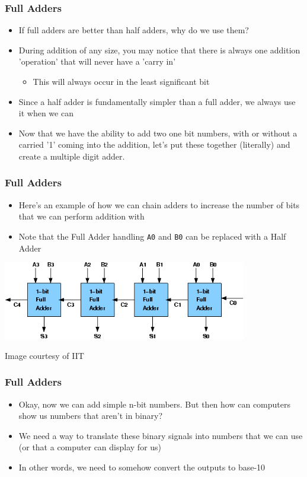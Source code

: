 \documentclass{beamer}
\begin{document}
		\begin{frame}
			\frametitle{Full Adders}
			\begin{itemize}
				\item If full adders are better than half adders, why do we use them?
				\item During addition of any size, you may notice that there is always one addition 'operation' that will never have a 'carry in'
				\begin{itemize}
					\item This will always occur in the least significant bit
				\end{itemize}
				\item Since a half adder is fundamentally simpler than a full adder, we always use it when we can
				\item Now that we have the ability to add two one bit numbers, with or without a carried '1' coming into the addition, let's put these together (literally) and create a multiple digit adder.
			\end{itemize}
		\end{frame}
		
		
		\begin{frame}
			\frametitle{Full Adders}
			\begin{itemize}
				\item Here's an example of how we can chain adders to increase the number of bits that we can perform addition with
				\item Note that the Full Adder handling \texttt{A0} and \texttt{B0} can be replaced with a Half Adder\linebreak
			\end{itemize}
			
			
			
			\centering
			
			\includegraphics[width=0.8\textwidth]{4bitadder}
			
			\centering
			{\tiny Image courtesy of IIT}
			
		\end{frame}
		
		\begin{frame}
			\frametitle{Full Adders}
			
			\begin{itemize}
				\item Okay, now we can add simple n-bit numbers. But then how can computers show us numbers that aren't in binary?
				\item We need a way to translate these binary signals into numbers that we can use (or that a computer can display for us)
				\item In other words, we need to somehow convert the outputs to base-10
			\end{itemize}
			
		\end{frame}
		
		
    
    
\end{document}
